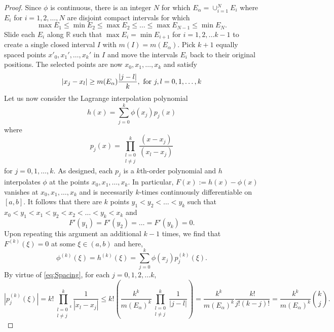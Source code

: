 \documentclass[11pt]{article}
\newcommand\R{\mathbb{R}}
\newcommand{\f}[2]{\frac{#1}{#2}}
\newcommand{\al}{\alpha}
\begin{document}
\begin{proof}
Since $\phi$ is continuous, there is an integer $N$ for which $E_\al = \cup^N_{i=1}E_i$ where $E_i$ for $i=1,2,\dots,N$ are disjoint compact intervals for which
\begin{equation*}
    \max{E_1} \leq \min{E_2} \leq \max{E_2} \leq \dots \leq \max{E_{N-1}}  \leq \min{E_N}.
\end{equation*}
Slide each $E_i$ along $\R$ such that $\max{E_i} = \min{E_{i+1}}$ for $i=1,2,\dots k-1$ to create a single closed interval $I$ with $m(I) = m(E_\al)$. Pick $k+1$ equally spaced points $x'_0,x_1',\dots,x_k'$ in $I$ and move the intervals $E_i$ back to their original positions. The selected points are now $x_0,x_1,\dots,x_k$ and satisfy
\begin{equation}\label{eq:Spacing}
    \abs{x_j - x_l} \geq m(E_\al)\f{\abs{j-l}}{k}, \mbox{ for } j,l = 0,1,\dots,k 
\end{equation}
Let us now consider the Lagrange interpolation polynomial
\begin{equation*}
    h(x)=\sum_{j=0}^k\phi(x_j)p_j(x)
\end{equation*}
where
\begin{equation*}
    p_j(x)=\prod_{\substack{l=0\\l\neq j}}^k\frac{(x-x_j)}{(x_l-x_j)}
\end{equation*}
for $j=0,1,\dots,k$. As designed, each $p_j$ is a $k$th-order polynomial and $h$ interpolates $\phi$ at the points $x_0,x_1,\dots,x_k$. In particular, $F(x):=h(x)-\phi(x)$ vanishes at $x_0,x_1,\dots,x_k$ and is necessarily $k$-times continuously differentiable on $[a,b]$. It follows that there are $k$ points $y_1<y_2<\dots < y_k$ such that $x_0 < y_1 < x_1 < y_2 < x_2 < \dots < y_k < x_k$ and
\begin{equation*}
    F'(y_1) = F'(y_2) = \dots = F'(y_k) = 0.
\end{equation*}
Upon repeating this argument an additional $k-1$ times, we find that $F^{(k)}(\xi) = 0$ at some $\xi\in (a,b)$ and here,
\begin{equation*}
    \phi^{(k)}(\xi) = h^{(k)}(\xi) = \sum_{j=0}^k \phi(x_j)p_j^{(k)}(\xi).
\end{equation*}
By virtue of \eqref{eq:Spacing}, for each $j=0,1,2,\dots k$,
\begin{equation*}
|p_j^{(k)}(\xi)|=k!\prod_{\substack{l=0\\l\neq j}^k}^k\frac{1}{|x_l-x_j|}\leq k!\left(\frac{k^k}{m(E_\alpha)^k}\prod_{\substack{l=0\\l\neq j}}^k\frac{1}{|j-l|}\right)=\frac{ k^k}{m(E_\alpha)^k}\frac{k!}{j!(k-j)!}=\frac{k^k}{m(E_\alpha)^k} {k\choose j}.

\end{equation*}
\end{proof}
\end{document}
